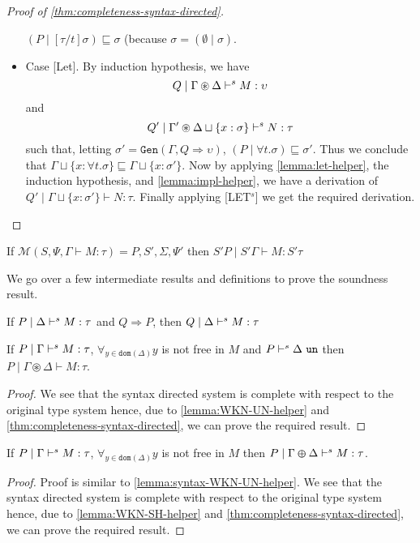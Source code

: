 \begin{proof}[Proof of \cref{thm:completeness-syntax-directed}]
\begin{itemize}
    $(P \mid [\tau / t]\sigma) \sqsubseteq \sigma$ (because $\sigma = (\emptyset \mid \sigma)$.
  \item{Case [Let].}
    By induction hypothesis, we have $$Q \mid \Gamma \circledast \Delta \vdash^s M: \upsilon$$ and
    $$Q' \mid \Gamma' \circledast \Delta \sqcup \{x:\sigma\} \vdash^s N:\tau$$
    such that, letting $\sigma' = \texttt{Gen}(\Gamma, Q \Rightarrow \upsilon)$, $(P \mid \forall t. \sigma) \sqsubseteq \sigma'$. Thus we conclude that
    $\Gamma \sqcup \{ x:\forall t. \sigma \} \sqsubseteq   \Gamma \sqcup \{ x:\sigma'\}$. Now by applying \cref{lemma:let-helper}, the induction hypothesis, and \cref{lemma:impl-helper},
    we have a derivation of $Q' \mid \Gamma \sqcup \{ x:\sigma'\} \vdash N:\tau$. Finally applying [LET$^s$] we get the required derivation.
      \qedhere
  \end{itemize}
\end{proof}


\begin{theorem}\label{thm:soundness-m}
   If $\mathcal{M}(S, \Psi, \Gamma \vdash M : \tau) = P, S', \Sigma, \Psi'$ then $S' P \mid S' \Gamma \vdash M : S' \tau$
 \end{theorem}

We go over a few intermediate results and definitions to prove the soundness result.

\begin{lemma}\label{lemma:strengthen}
  If $P \mid \Delta \vdash^s M:\tau$ and $Q \Rightarrow P$, then $Q \mid \Delta \vdash^s M: \tau$
\end{lemma}

\begin{lemma}\label{lemma:syntax-WKN-UN-helper}
  If $P \mid \Gamma \vdash^s M:\tau$, $\forall_{y \in \texttt{dom}(\Delta)} y$ is not free in $M$ and $P \vdash^s \Delta\ \texttt{un}$
  then $P \mid \Gamma \circledast \Delta \vdash M:\tau$.
\end{lemma}
\begin{proof}
  We see that the syntax directed system is complete with respect to the original type system hence, due to \cref{lemma:WKN-UN-helper} and \cref{thm:completeness-syntax-directed}, we can prove the required result.
\end{proof}

\begin{lemma}\label{lemma:syntax-WKN-SH-helper}
  If $P \mid \Gamma \vdash^s M:\tau$, $\forall_{y \in \texttt{dom}(\Delta)} y$ is not free in $M$ then $P \mid \Gamma \varoplus \Delta \vdash^s M:\tau$.
\end{lemma}
\begin{proof}
  Proof is similar to \cref{lemma:syntax-WKN-UN-helper}. We see that the syntax directed system is complete with respect to the original type system hence,
  due to \cref{lemma:WKN-SH-helper} and \cref{thm:completeness-syntax-directed}, we can prove the required result.
\end{proof}

